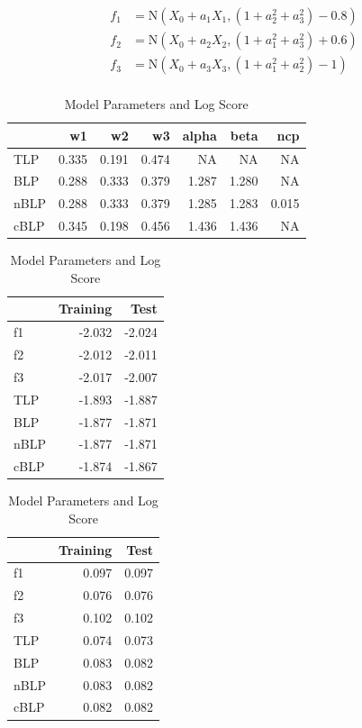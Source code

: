 \documentclass[]{article}
\begin{document}
\[
\begin{aligned}
f_1&=\text{N}(X_0+a_1X_1,(1+a^2_2+a^2_3)-0.8)\\
f_2&=\text{N}(X_0+a_2X_2,(1+a^2_1+a^2_3)+0.6)\\
f_3&=\text{N}(X_0+a_3X_3,(1+a^2_1+a^2_2)-1)\\
\end{aligned}
\]

\begin{table}[!h]
\caption{\label{tab:unnamed-chunk-15}Model Parameters and Log Score}

\centering
\begin{tabular}[t]{lrrrrrr}
\toprule
  & w1 & w2 & w3 & alpha & beta & ncp\\
\midrule
\rowcolor{gray!6}  TLP & 0.335 & 0.191 & 0.474 & NA & NA & NA\\
BLP & 0.288 & 0.333 & 0.379 & 1.287 & 1.280 & NA\\
\rowcolor{gray!6}  nBLP & 0.288 & 0.333 & 0.379 & 1.285 & 1.283 & 0.015\\
cBLP & 0.345 & 0.198 & 0.456 & 1.436 & 1.436 & NA\\
\bottomrule
\end{tabular}
\centering
\begin{tabular}[t]{lrr}
\toprule
\rowcolor{gray!6}    & Training & \vphantom{1} Test\\
\midrule
f1 & -2.032 & -2.024\\
\rowcolor{gray!6}  f2 & -2.012 & -2.011\\
f3 & -2.017 & -2.007\\
\rowcolor{gray!6}  TLP & -1.893 & -1.887\\
BLP & -1.877 & -1.871\\
\addlinespace
\rowcolor{gray!6}  nBLP & -1.877 & -1.871\\
cBLP & -1.874 & -1.867\\
\bottomrule
\end{tabular}
\centering
\begin{tabular}[t]{lrr}
\toprule
\rowcolor{gray!6}    & Training & Test\\
\midrule
f1 & 0.097 & 0.097\\
\rowcolor{gray!6}  f2 & 0.076 & 0.076\\
f3 & 0.102 & 0.102\\
\rowcolor{gray!6}  TLP & 0.074 & 0.073\\
BLP & 0.083 & 0.082\\
\addlinespace
\rowcolor{gray!6}  nBLP & 0.083 & 0.082\\
cBLP & 0.082 & 0.082\\
\bottomrule
\end{tabular}
\end{table}
\end{document}
